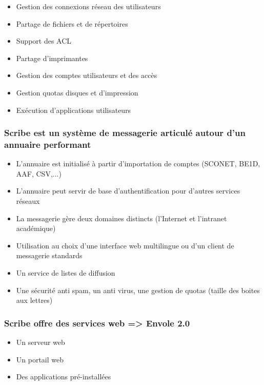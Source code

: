 \begin{itemize}
  \item Gestion des connexions réseau des utilisateurs
  \item Partage de fichiers et de répertoires
  \item Support des ACL
  \item Partage d'imprimantes
  \item Gestion des comptes utilisateurs et des accès
  \item Gestion quotas disques et d'impression
  \item Exécution d'applications utilisateurs
\end{itemize}

\subsubsection{Scribe est un système de messagerie articulé autour d'un 
               annuaire performant}

\begin{itemize}
  \item L'annuaire est initialisé à partir d'importation de comptes 
        (SCONET, BE1D, AAF, CSV,...)
  \item L'annuaire peut servir de base d'authentification pour d'autres 
        services réseaux
  \item La messagerie gère deux domaines distincts (l'Internet et 
        l'intranet académique)
  \item Utilisation au choix d'une interface web multilingue ou d'un 
        client de messagerie standards
  \item Un service de listes de diffusion
  \item Une sécurité anti spam, un anti virus, une gestion de quotas 
        (taille des boites aux lettres)
\end{itemize}

\subsubsection{Scribe offre des services web => Envole 2.0}

\begin{itemize}
  \item Un serveur web
  \item Un portail web
  \item Des applications pré-installées
\end{itemize}


